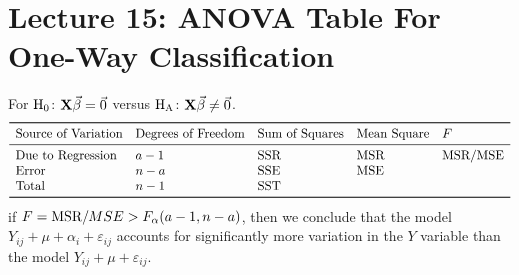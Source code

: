\section{Lecture 15: ANOVA Table For One-Way Classification}
For $ \text{H}_0 $: $ \mathbf{X}\vec{\beta}=\vec{0} $ versus $ \text{H}_{\text{A}} $: $ \mathbf{X}\vec{\beta}\ne \vec{0} $.
\[ \begin{array}{lllll}
        \toprule
        \text{Source of Variation} & \text{Degrees of Freedom} & \text{Sum of Squares} & \text{Mean Square} & F         \\
        \midrule
        \text{Due to Regression}   & a-1                       & \SSR                  & \MSR               & \MSR/\MSE \\
        \text{Error}               & n-a                       & \SSE                  & \MSE                           \\
        \text{Total}               & n-1                       & \SST                                                   \\
        \bottomrule
    \end{array} \]
if $ F=\text{MSR}/MSE >F_{\alpha}(a-1,n-a) $, then we conclude
that the model $ Y_{ij}+\mu+\alpha_i+\varepsilon_{ij} $
accounts for significantly more variation in the $ Y $ variable
than the model $ Y_{ij}+\mu+\varepsilon_{ij} $.

